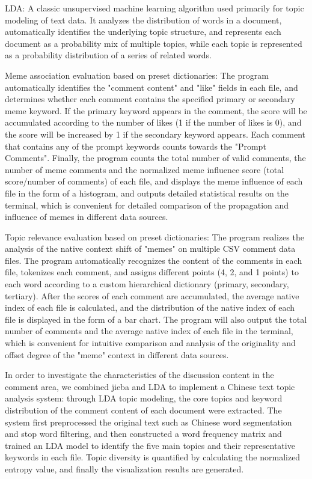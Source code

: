\documentclass[12pt,a4paper]{ctexart}
\theoremstyle{MyLineTheoremStyle}
\theoremstyle{MyBlockTheoremStyle}
\theoremstyle{MySubsubsectionStyle}
\begin{document}
LDA: A classic unsupervised machine learning algorithm used primarily for topic modeling of text data. It analyzes the distribution of words in a document, automatically identifies the underlying topic structure, and represents each document as a probability mix of multiple topics, while each topic is represented as a probability distribution of a series of related words.

Meme association evaluation based on preset dictionaries: The program automatically identifies the "comment content" and "like" fields in each file, and determines whether each comment contains the specified primary or secondary meme keyword. If the primary keyword appears in the comment, the score will be accumulated according to the number of likes (1 if the number of likes is 0), and the score will be increased by 1 if the secondary keyword appears. Each comment that contains any of the prompt keywords counts towards the "Prompt Comments". Finally, the program counts the total number of valid comments, the number of meme comments and the normalized meme influence score (total score/number of comments) of each file, and displays the meme influence of each file in the form of a histogram, and outputs detailed statistical results on the terminal, which is convenient for detailed comparison of the propagation and influence of memes in different data sources.

Topic relevance evaluation based on preset dictionaries: The program realizes the analysis of the native context shift of "memes" on multiple CSV comment data files. The program automatically recognizes the content of the comments in each file, tokenizes each comment, and assigns different points (4, 2, and 1 points) to each word according to a custom hierarchical dictionary (primary, secondary, tertiary). After the scores of each comment are accumulated, the average native index of each file is calculated, and the distribution of the native index of each file is displayed in the form of a bar chart. The program will also output the total number of comments and the average native index of each file in the terminal, which is convenient for intuitive comparison and analysis of the originality and offset degree of the "meme" context in different data sources.

In order to investigate the characteristics of the discussion content in the comment area, we combined jieba and LDA to implement a Chinese text topic analysis system: through LDA topic modeling, the core topics and keyword distribution of the comment content of each document were extracted. The system first preprocessed the original text such as Chinese word segmentation and stop word filtering, and then constructed a word frequency matrix and trained an LDA model to identify the five main topics and their representative keywords in each file. Topic diversity is quantified by calculating the normalized entropy value, and finally the visualization results are generated.
\end{document}

